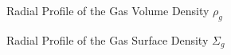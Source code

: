 \clearpage
\begin{figure}[h!]
    \caption{Radial Profile of the Gas Volume Density $\rho_g$}
\end{figure}

\begin{figure}[h!]
    \caption{Radial Profile of the Gas Surface Density $\Sigma_g$
    }
\end{figure}



